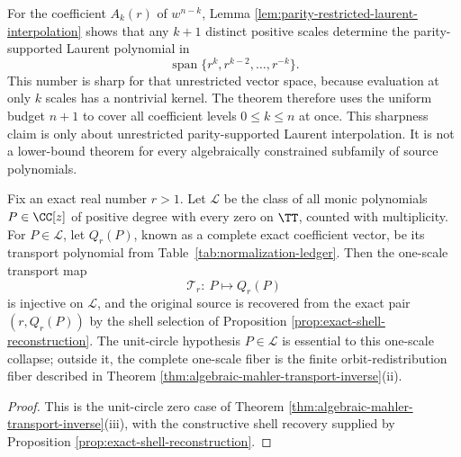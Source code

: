 \begin{remark}\label{rem:multiscale-sharpness-scope}
For the coefficient \(A_k(r)\) of \(w^{n-k}\), Lemma \ref{lem:parity-restricted-laurent-interpolation} shows that any \(k+1\) distinct positive scales determine the parity-supported Laurent polynomial in
\[
\operatorname{span}\{r^k,r^{k-2},\dots,r^{-k}\}.
\]
This number is sharp for that unrestricted vector space, because evaluation at only \(k\) scales has a nontrivial kernel.  The theorem therefore uses the uniform budget \(n+1\) to cover all coefficient levels \(0\le k\le n\) at once.  This sharpness claim is only about unrestricted parity-supported Laurent interpolation.  It is not a lower-bound theorem for every algebraically constrained subfamily of source polynomials.
\end{remark}

\begin{theorem}\label{thm:leyang-single-scale-reconstruction}
Fix an exact real number \(r>1\).  Let \(\mathcal L\) be the class of all monic polynomials \(P\in\CC[z]\) of positive degree with every zero on \(\TT\), counted with multiplicity.  For \(P\in\mathcal L\), let \(Q_r(P)\), known as a complete exact coefficient vector, be its transport polynomial from Table~\ref{tab:normalization-ledger}.  Then the one-scale transport map
\[
\mathcal T_r:\ P\longmapsto Q_r(P)
\]
is injective on \(\mathcal L\), and the original source is recovered from the exact pair \((r,Q_r(P))\) by the shell selection of Proposition \ref{prop:exact-shell-reconstruction}.  The unit-circle hypothesis \(P\in\mathcal L\) is essential to this one-scale collapse; outside it, the complete one-scale fiber is the finite orbit-redistribution fiber described in Theorem \ref{thm:algebraic-mahler-transport-inverse}\textup{(ii)}.
\end{theorem}

\begin{proof}
This is the unit-circle zero case of Theorem \ref{thm:algebraic-mahler-transport-inverse}(iii), with the constructive shell recovery supplied by Proposition \ref{prop:exact-shell-reconstruction}.
\end{proof}

